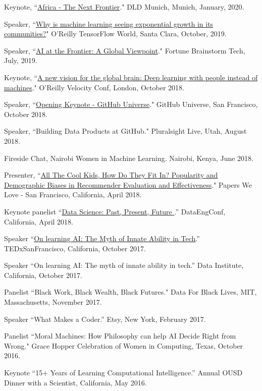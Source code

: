 \documentclass[11pt,article,oneside]{memoir}
\begin{document}
\ind Keynote, ``\href{https://www.youtube.com/watch?v=uC5ZRaK8Ebc}{Africa - The Next Frontier}." DLD Munich, Munich, January, 2020.

\ind Speaker, ``\href{https://www.oreilly.com/library/view/oreilly-tensorflow-world/0636920333111/video328051.html}{Why is machine learning seeing exponential growth in its communities?}" O'Reilly TensorFlow World, Santa Clara, October, 2019.

\ind Speaker, ``\href{https://www.youtube.com/watch?v=NPk-y_tH7JY}{AI at the Frontier: A Global Viewpoint}." Fortune Brainstorm Tech, July, 2019.

\ind Keynote, ``\href{https://youtu.be/Teq3pa1L7Tg}{A new vision for the global brain: Deep learning with people instead of machines}." O'Reilly Velocity Conf, London, October 2018.

\ind Speaker, ``\href{https://www.youtube.com/watch?v=vB5nTx5fUXM}{Opening Keynote - GitHub Universe}." GitHub Universe, San Francisco, October 2018.


\ind Speaker, ``Building Data Products at GitHub." Pluralsight Live, Utah, August 2018.

\ind Fireside Chat, Nairobi Women in Machine Learning. Nairobi, Kenya, June 2018.

\ind Presenter, ``\href{http://proceedings.mlr.press/v81/ekstrand18b/ekstrand18b.pdf}{All The Cool Kids, How Do They Fit In? Popularity and Demographic Biases in Recommender Evaluation and Effectiveness}." Papers We Love - San Francisco, California, April 2018. 

\ind Keynote panelist ``\href{https://youtu.be/_F534KBWFJc}{Data Science: Past, Present, Future }.'' DataEngConf, California, April 2018.

\ind Speaker ``\href{https://youtu.be/BFWVHSeakkg}{On learning AI: The Myth of Innate Ability in Tech}.'' TEDxSanFrancisco, California, October 2017.

\ind Speaker ``On learning AI: The myth of innate ability in tech.'' Data Institute, California, October 2017.

\ind Panelist ``Black Work, Black Wealth, Black Futures." Data For Black Lives, MIT, Massachusetts, November 2017.

\ind Speaker ``What Makes a Coder.'' Etsy, New York, February 2017.

\ind Panelist ``Moral Machines: How Philosophy can help AI Decide Right from Wrong." Grace Hopper Celebration of Women in Computing, Texas, October 2016.

\ind Keynote ``15+ Years of Learning Computational Intelligence.'' Annual OUSD Dinner with a Scientist, California, May 2016.
\end{document}
